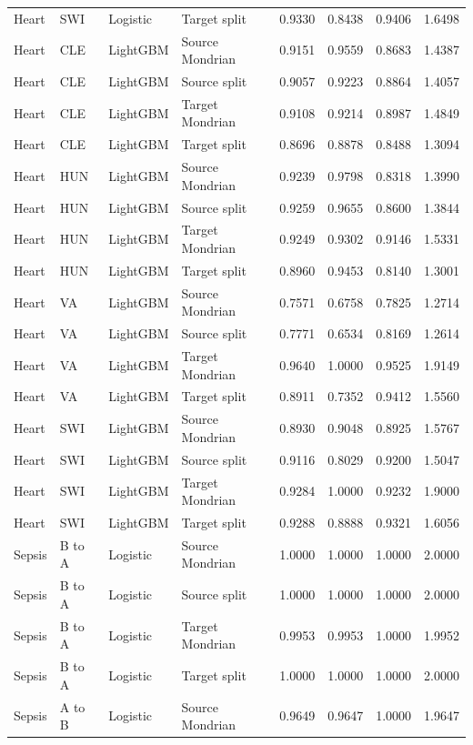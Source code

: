 \begin{longtable}{L{1cm}L{1.3cm}L{1.6cm}L{3.1cm}rrrr}
Heart & SWI & Logistic & Target split & 0.9330 & 0.8438 & 0.9406 & 1.6498 \\
Heart & CLE & LightGBM & Source Mondrian & 0.9151 & 0.9559 & 0.8683 & 1.4387 \\
Heart & CLE & LightGBM & Source split & 0.9057 & 0.9223 & 0.8864 & 1.4057 \\
Heart & CLE & LightGBM & Target Mondrian & 0.9108 & 0.9214 & 0.8987 & 1.4849 \\
Heart & CLE & LightGBM & Target split & 0.8696 & 0.8878 & 0.8488 & 1.3094 \\
Heart & HUN & LightGBM & Source Mondrian & 0.9239 & 0.9798 & 0.8318 & 1.3990 \\
Heart & HUN & LightGBM & Source split & 0.9259 & 0.9655 & 0.8600 & 1.3844 \\
Heart & HUN & LightGBM & Target Mondrian & 0.9249 & 0.9302 & 0.9146 & 1.5331 \\
Heart & HUN & LightGBM & Target split & 0.8960 & 0.9453 & 0.8140 & 1.3001 \\
Heart & VA & LightGBM & Source Mondrian & 0.7571 & 0.6758 & 0.7825 & 1.2714 \\
Heart & VA & LightGBM & Source split & 0.7771 & 0.6534 & 0.8169 & 1.2614 \\
Heart & VA & LightGBM & Target Mondrian & 0.9640 & 1.0000 & 0.9525 & 1.9149 \\
Heart & VA & LightGBM & Target split & 0.8911 & 0.7352 & 0.9412 & 1.5560 \\
Heart & SWI & LightGBM & Source Mondrian & 0.8930 & 0.9048 & 0.8925 & 1.5767 \\
Heart & SWI & LightGBM & Source split & 0.9116 & 0.8029 & 0.9200 & 1.5047 \\
Heart & SWI & LightGBM & Target Mondrian & 0.9284 & 1.0000 & 0.9232 & 1.9000 \\
Heart & SWI & LightGBM & Target split & 0.9288 & 0.8888 & 0.9321 & 1.6056 \\
Sepsis & B to A & Logistic & Source Mondrian & 1.0000 & 1.0000 & 1.0000 & 2.0000 \\
Sepsis & B to A & Logistic & Source split & 1.0000 & 1.0000 & 1.0000 & 2.0000 \\
Sepsis & B to A & Logistic & Target Mondrian & 0.9953 & 0.9953 & 1.0000 & 1.9952 \\
Sepsis & B to A & Logistic & Target split & 1.0000 & 1.0000 & 1.0000 & 2.0000 \\
Sepsis & A to B & Logistic & Source Mondrian & 0.9649 & 0.9647 & 1.0000 & 1.9647 \\

\end{longtable}
